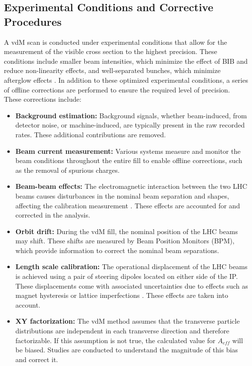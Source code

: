 \subsection{Experimental Conditions and Corrective Procedures}
\label{sec:experiment_conditions_and_corrective_procedures}

A vdM scan is conducted under experimental conditions that allow for the measurement of the visible cross section to the highest precision. These conditions include smaller beam intensities, which minimize the effect of BIB and reduce non-linearity effects, and well-separated bunches, which minimize afterglow effects \cite{GRAFSTROM201597}. In addition to these optimized experimental conditions, a series of offline corrections are performed to ensure the required level of precision. These corrections include:

\begin{itemize}
    \item \textbf{Background estimation:} Background signals, whether beam-induced, from detector noise, or machine-induced, are typically present in the raw recorded rates. These additional contributions are removed.
    \item \textbf{Beam current measurement:} Various systems measure and monitor the beam conditions throughout the entire fill to enable offline corrections, such as the removal of spurious charges.
    \item \textbf{Beam-beam effects:} The electromagnetic interaction between the two LHC beams causes disturbances in the nominal beam separation and shapes, affecting the calibration measurement \cite{Babaev2024}. These effects are accounted for and corrected in the analysis.
    \item \textbf{Orbit drift:} During the vdM fill, the nominal position of the LHC beams may shift. These shifts are measured by Beam Position Monitors (BPM), which provide information to correct the nominal beam separations.
    \item \textbf{Length scale calibration:} The operational displacement of the LHC beams is achieved using a pair of steering dipoles located on either side of the IP. These displacements come with associated uncertainties due to effects such as magnet hysteresis or lattice imperfections \cite{Persson:2750277}. These effects are taken into account.
    \item \textbf{XY factorization:} The vdM method assumes that the transverse particle distributions are independent in each transverse direction and therefore factorizable. If this assumption is not true, the calculated value for \(A_{eff}\) will be biased. Studies are conducted to understand the magnitude of this bias and correct it.
\end{itemize}

